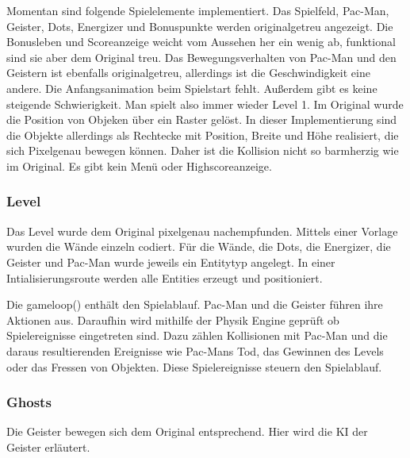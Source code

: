 \documentclass[a4paper, 11pt]{article}
\begin{document}
Momentan sind folgende Spielelemente implementiert. Das Spielfeld, Pac-Man, Geister, Dots, Energizer und Bonuspunkte werden originalgetreu angezeigt. Die Bonusleben und Scoreanzeige weicht vom Aussehen her ein wenig ab, funktional sind sie aber dem Original treu. Das Bewegungsverhalten von Pac-Man und den Geistern ist ebenfalls originalgetreu, allerdings ist die Geschwindigkeit eine andere. Die Anfangsanimation beim Spielstart fehlt. Außerdem gibt es keine steigende Schwierigkeit. Man spielt also immer wieder Level 1. Im Original wurde die Position von Objeken über ein Raster gelöst. In dieser Implementierung sind die Objekte allerdings als Rechtecke mit Position, Breite und Höhe realisiert, die sich Pixelgenau bewegen können. Daher ist die Kollision nicht so barmherzig wie im Original. Es gibt kein Menü oder Highscoreanzeige. 


\subsubsection{Level}

Das Level wurde dem Original pixelgenau nachempfunden. Mittels einer Vorlage wurden die Wände einzeln codiert. Für die Wände, die Dots, die Energizer, die Geister und Pac-Man wurde jeweils ein Entitytyp angelegt. In einer Intialisierungsroute werden alle Entities erzeugt und positioniert. 

Die gameloop() enthält den Spielablauf. Pac-Man und die Geister führen ihre Aktionen aus. Daraufhin wird mithilfe der Physik Engine geprüft ob Spielereignisse eingetreten sind. Dazu zählen Kollisionen mit Pac-Man und die daraus resultierenden Ereignisse wie Pac-Mans Tod, das Gewinnen des Levels oder das Fressen von Objekten. Diese Spielereignisse steuern den Spielablauf. 

\subsubsection{Ghosts}

Die Geister bewegen sich dem Original entsprechend. Hier wird die KI der Geister erläutert. 
\end{document}
